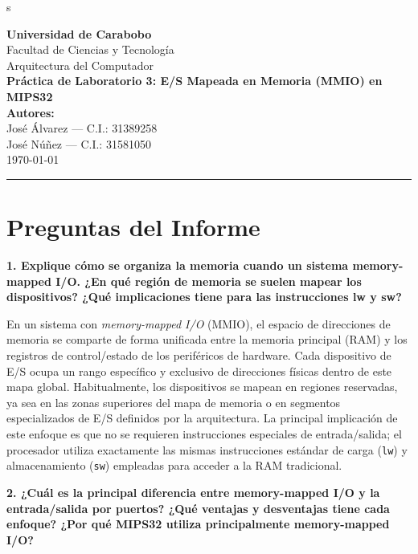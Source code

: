 s\documentclass[11pt,a4paper]{article}
\begin{document}
\begin{center}
    {\Large \textbf{Universidad de Carabobo}} \\[0.2cm]
    {\large Facultad de Ciencias y Tecnología} \\[0.2cm]
    {\normalsize Arquitectura del Computador} \\[0.5cm]
    {\Large \textbf{Práctica de Laboratorio 3: E/S Mapeada en Memoria (MMIO) en MIPS32}} \\[0.5cm]
    
    \textbf{Autores:} \\
    José Álvarez --- C.I.: 31389258 \\
    José Núñez --- C.I.: 31581050 \\
    \vspace{0.3cm}
    \today
\end{center}

\hrule
\vspace{0.5cm}

\section*{Preguntas del Informe}

\noindent\textbf{1. Explique cómo se organiza la memoria cuando un sistema memory-mapped I/O. ¿En qué región de memoria se suelen mapear los dispositivos? ¿Qué implicaciones tiene para las instrucciones lw y sw?}

\vspace{0.5cm}
En un sistema con \textit{memory-mapped I/O} (MMIO), el espacio de direcciones de memoria se comparte de forma unificada entre la memoria principal (RAM) y los registros de control/estado de los periféricos de hardware. Cada dispositivo de E/S ocupa un rango específico y exclusivo de direcciones físicas dentro de este mapa global. Habitualmente, los dispositivos se mapean en regiones reservadas, ya sea en las zonas superiores del mapa de memoria o en segmentos especializados de E/S definidos por la arquitectura. La principal implicación de este enfoque es que no se requieren instrucciones especiales de entrada/salida; el procesador utiliza exactamente las mismas instrucciones estándar de carga (\texttt{lw}) y almacenamiento (\texttt{sw}) empleadas para acceder a la RAM tradicional.

\vspace{0.4cm}
\noindent\textbf{2. ¿Cuál es la principal diferencia entre memory-mapped I/O y la entrada/salida por puertos? ¿Qué ventajas y desventajas tiene cada enfoque? ¿Por qué MIPS32 utiliza principalmente memory-mapped I/O?}
\end{document}
